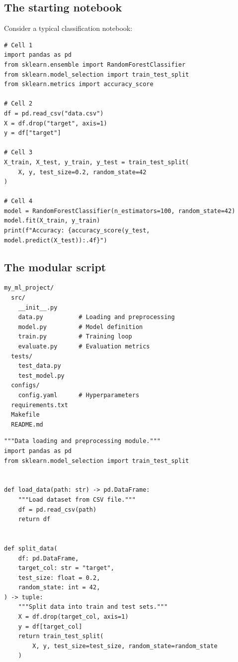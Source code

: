 \subsection{The starting notebook}

Consider a typical classification notebook:

\begin{codeblock}[title=\textbf{Typical notebook (anti-pattern)}]
\begin{verbatim}
# Cell 1
import pandas as pd
from sklearn.ensemble import RandomForestClassifier
from sklearn.model_selection import train_test_split
from sklearn.metrics import accuracy_score

# Cell 2
df = pd.read_csv("data.csv")
X = df.drop("target", axis=1)
y = df["target"]

# Cell 3
X_train, X_test, y_train, y_test = train_test_split(
    X, y, test_size=0.2, random_state=42
)

# Cell 4
model = RandomForestClassifier(n_estimators=100, random_state=42)
model.fit(X_train, y_train)
print(f"Accuracy: {accuracy_score(y_test, model.predict(X_test)):.4f}")
\end{verbatim}
\end{codeblock}

\subsection{The modular script}

\begin{bestpractice}[title=\textbf{Recommended project structure}]
\begin{verbatim}
my_ml_project/
  src/
    __init__.py
    data.py          # Loading and preprocessing
    model.py         # Model definition
    train.py         # Training loop
    evaluate.py      # Evaluation metrics
  tests/
    test_data.py
    test_model.py
  configs/
    config.yaml      # Hyperparameters
  requirements.txt
  Makefile
  README.md
\end{verbatim}
\end{bestpractice}

\begin{codeblock}[title=\textbf{src/data.py --- Data module}]
\begin{verbatim}
"""Data loading and preprocessing module."""
import pandas as pd
from sklearn.model_selection import train_test_split


def load_data(path: str) -> pd.DataFrame:
    """Load dataset from CSV file."""
    df = pd.read_csv(path)
    return df


def split_data(
    df: pd.DataFrame,
    target_col: str = "target",
    test_size: float = 0.2,
    random_state: int = 42,
) -> tuple:
    """Split data into train and test sets."""
    X = df.drop(target_col, axis=1)
    y = df[target_col]
    return train_test_split(
        X, y, test_size=test_size, random_state=random_state
    )
\end{verbatim}
\end{codeblock}

